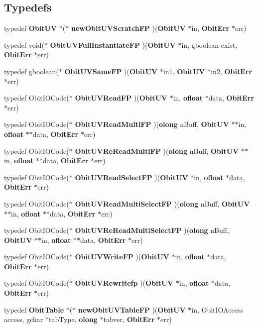 \subsection*{Typedefs}
\begin{CompactItemize}
\item 
typedef {\bf Obit\-UV} $\ast$($\ast$ {\bf new\-Obit\-UVScratch\-FP} )({\bf Obit\-UV} $\ast$in, {\bf Obit\-Err} $\ast$err)
\item 
typedef void($\ast$ {\bf Obit\-UVFull\-Instantiate\-FP} )({\bf Obit\-UV} $\ast$in, gboolean exist, {\bf Obit\-Err} $\ast$err)
\item 
typedef gboolean($\ast$ {\bf Obit\-UVSame\-FP} )({\bf Obit\-UV} $\ast$in1, {\bf Obit\-UV} $\ast$in2, {\bf Obit\-Err} $\ast$err)
\item 
typedef Obit\-IOCode($\ast$ {\bf Obit\-UVRead\-FP} )({\bf Obit\-UV} $\ast$in, {\bf ofloat} $\ast$data, {\bf Obit\-Err} $\ast$err)
\item 
typedef Obit\-IOCode($\ast$ {\bf Obit\-UVRead\-Multi\-FP} )({\bf olong} n\-Buff, {\bf Obit\-UV} $\ast$$\ast$in, {\bf ofloat} $\ast$$\ast$data, {\bf Obit\-Err} $\ast$err)
\item 
typedef Obit\-IOCode($\ast$ {\bf Obit\-UVRe\-Read\-Multi\-FP} )({\bf olong} n\-Buff, {\bf Obit\-UV} $\ast$$\ast$in, {\bf ofloat} $\ast$$\ast$data, {\bf Obit\-Err} $\ast$err)
\item 
typedef Obit\-IOCode($\ast$ {\bf Obit\-UVRead\-Select\-FP} )({\bf Obit\-UV} $\ast$in, {\bf ofloat} $\ast$data, {\bf Obit\-Err} $\ast$err)
\item 
typedef Obit\-IOCode($\ast$ {\bf Obit\-UVRead\-Multi\-Select\-FP} )({\bf olong} n\-Buff, {\bf Obit\-UV} $\ast$$\ast$in, {\bf ofloat} $\ast$$\ast$data, {\bf Obit\-Err} $\ast$err)
\item 
typedef Obit\-IOCode($\ast$ {\bf Obit\-UVRe\-Read\-Multi\-Select\-FP} )({\bf olong} n\-Buff, {\bf Obit\-UV} $\ast$$\ast$in, {\bf ofloat} $\ast$$\ast$data, {\bf Obit\-Err} $\ast$err)
\item 
typedef Obit\-IOCode($\ast$ {\bf Obit\-UVWrite\-FP} )({\bf Obit\-UV} $\ast$in, {\bf ofloat} $\ast$data, {\bf Obit\-Err} $\ast$err)
\item 
typedef Obit\-IOCode($\ast$ {\bf Obit\-UVRewritefp} )({\bf Obit\-UV} $\ast$in, {\bf ofloat} $\ast$data, {\bf Obit\-Err} $\ast$err)
\item 
typedef {\bf Obit\-Table} $\ast$($\ast$ {\bf new\-Obit\-UVTable\-FP} )({\bf Obit\-UV} $\ast$in, Obit\-IOAccess access, gchar $\ast$tab\-Type, {\bf olong} $\ast$tabver, {\bf Obit\-Err} $\ast$err)

\end{CompactItemize}
